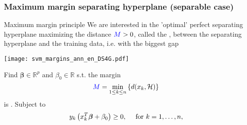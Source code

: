 \begin{frame}
   \frametitle{Maximum margin separating hyperplane (separable case)}
   
   

   
   \begin{block}{Maximum margin principle}
   We are interested in the 'optimal' perfect separating hyperplane maximizing the distance ${\textcolor{blue}{M}}>0$, called the ,
   between the separating hyperplane and the training data, i.e. with the biggest gap
    \end{block}
    \bigskip
   \begin{minipage}{.6\textwidth}
       \begin{center}
      \texttt{[image: svm\_margins\_ann\_en\_DS4G.pdf]}
   \end{center}
   \end{minipage}
 \begin{minipage}{.39\textwidth}
Find  $\boldsymbol{\beta}  \in \mathbb{R}^p$ and $\beta_0 \in \mathbb{R}$ s.t. the margin
    $$
      {\textcolor{blue}{M}}= \min_{1\le k \le n} \left\{ d(x_k,\mathcal{H}) \right\}
    $$
    is . Subject to 
   $$\begin{displaystyle}       y_k  \left(  x^T_k \boldsymbol{\beta} + \beta_0 \right) \ge 0, \quad \text{ for } k=1,\ldots,n,
  \end{displaystyle}$$

   \end{minipage} 

  \end{frame}    
%   
%   
%    

